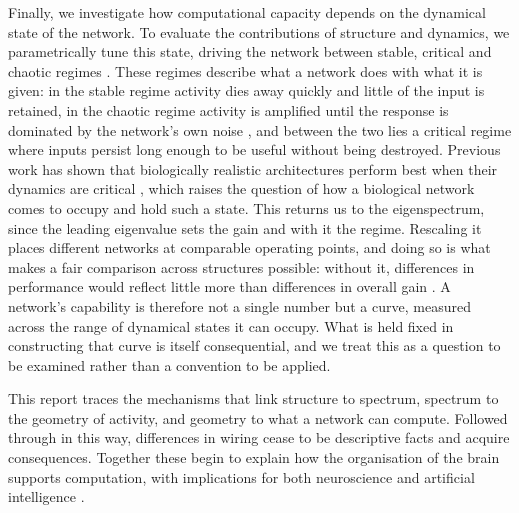 Finally, we investigate how computational capacity depends on the dynamical state of the network. To 
evaluate the contributions of structure and dynamics, we parametrically tune this state, driving the 
network between stable, critical and chaotic regimes \cite{kadmon2015transition}. 
These regimes describe what a network does with what it is given: in the stable regime activity dies 
away quickly and little of the input is retained, in the chaotic regime activity is amplified until 
the response is dominated by the network's own noise \cite{sompolinsky1988chaos}, 
and between the two lies a critical regime where inputs persist long enough to be useful without being 
destroyed. Previous work has shown that biologically realistic architectures perform best when their 
dynamics are critical \cite{bertschinger2004edge}, which raises the question of how a biological network comes to occupy and hold 
such a state.
This returns us to the eigenspectrum, since the leading eigenvalue sets the gain and with it the regime. 
Rescaling it places different networks at comparable operating points, and doing so is what makes a fair 
comparison across structures possible: without it, differences in performance would reflect little more 
than differences in overall gain \cite{suarez2021learning}. A network's capability is therefore not a single number but a curve, 
measured across the range of dynamical states it can occupy. What is held fixed in constructing that 
curve is itself consequential, and we treat this as a question to be examined rather than a convention 
to be applied. 

This report traces the mechanisms that link structure to spectrum, spectrum to the geometry of activity, 
and geometry to what a network can compute. Followed through in this way, differences in wiring cease to 
be descriptive facts and acquire consequences. Together these begin to explain how the organisation of 
the brain supports computation, with implications for both neuroscience and artificial intelligence 
\cite{hassabis2017neuroscience,sadeh2025emergence}.


